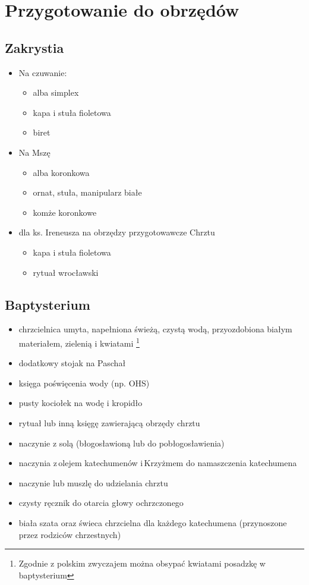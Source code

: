 \section{Przygotowanie do obrzędów}

\subsection{Zakrystia}
\begin{itemize}
	\item Na czuwanie:
	      \begin{itemize}
		      \item alba simplex
		      \item kapa i stuła {\color{violet} fioletowa}
		      \item biret
	      \end{itemize}
	\item Na Mszę
	      \begin{itemize}
		      \item alba koronkowa
		      \item ornat, stuła, manipularz białe
		      \item komże koronkowe
	      \end{itemize}
	\item dla ks. Ireneusza na obrzędzy przygotowawcze Chrztu
	      \begin{itemize}
		      \item kapa i stuła {\color{violet} fioletowa}
		      \item rytuał wrocławski
	      \end{itemize}
\end{itemize}

\subsection{Baptysterium}
\begin{itemize}
	\item chrzcielnica umyta, napełniona świeżą, czystą wodą, przyozdobiona
	      białym materiałem, zielenią i kwiatami \footnote{Zgodnie z polskim
		      zwyczajem można obsypać kwiatami posadzkę w baptysterium}
	\item dodatkowy stojak na Paschał
	\item księga poświęcenia wody (np. OHS)
	\item pusty kociołek na wodę i kropidło
	\item rytuał lub inną księgę zawierającą obrzędy chrztu
	\item naczynie z solą (błogosławioną lub do pobłogosławienia)
	\item naczynia z olejem katechumenów i Krzyżmem do namaszczenia katechumena
	\item naczynie lub muszlę do udzielania chrztu
	\item czysty ręcznik do otarcia głowy ochrzczonego
	\item biała szata oraz świeca chrzcielna dla każdego katechumena
	      (przynoszone przez rodziców chrzestnych)
\end{itemize}

